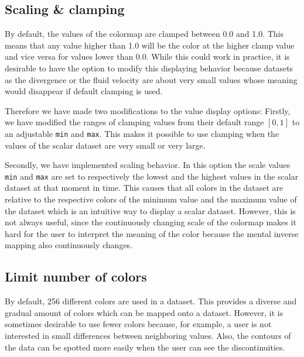 	\subsection{Scaling \& clamping}
		By default, the values of the colormap are clamped between 0.0 and 1.0. 
		This means that any value higher than 1.0 will be the color at the higher clamp value and vice versa for values lower than 0.0.
		While this could work in practice, it is desirable to have the option to modify this displaying behavior because datasets as the divergence or the fluid velocity are about very small values whose meaning would disappear if default clamping is used.

		Therefore we have made two modifications to the value display options:
		Firstly, we have modified the ranges of clamping values from their default range \([0, 1]\) to an adjustable \texttt{min} and \texttt{max}. 
		This makes it possible to use clamping when the values of the scalar dataset are very small or very large.

		Secondly, we have implemented scaling behavior. 
		In this option the scale values \texttt{min} and \texttt{max} are set to respectively the lowest and the highest values in the scalar dataset at that moment in time. 
		This causes that all colors in the dataset are relative to the respective colors of the minimum value and the maximum value of the dataset which is an intuitive way to display a scalar dataset.
		However, this is not always useful, since the continuously changing scale of the colormap makes it hard for the user to interpret the meaning of the color because the mental inverse mapping also continuously changes.

	\clearpage

	\subsection{Limit number of colors}
		By default, 256 different colors are used in a dataset. 
		This provides a diverse and gradual amount of colors which can be mapped onto a dataset.
		However, it is sometimes desirable to use fewer colors because, for example, a user is not interested in small differences between neighboring values.
		Also, the contours of the data can be spotted more easily when the user can see the discontinuities.

